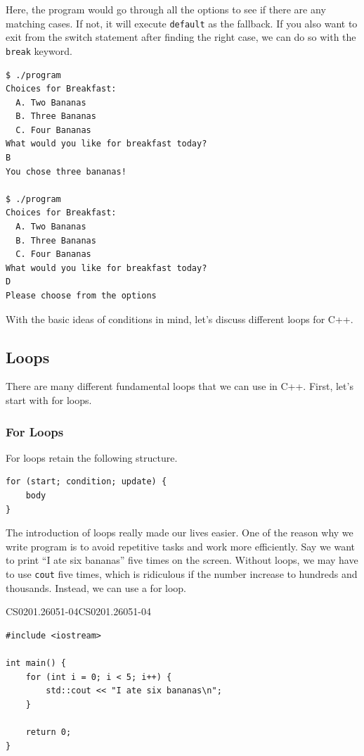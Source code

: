 \documentclass[../../main.tex]{subfiles}
\begin{document}
Here, the program would go through all the options to see
if there are any matching cases. If not, it will execute
\verb|default| as the fallback. If you also want to exit from the
switch statement after finding the right case, we can do so
with the \verb|break| keyword.

\begin{outputbox}
\begin{lstlisting}[style=basic]
$ ./program
Choices for Breakfast:
  A. Two Bananas
  B. Three Bananas
  C. Four Bananas
What would you like for breakfast today?
B
You chose three bananas!

$ ./program
Choices for Breakfast:
  A. Two Bananas
  B. Three Bananas
  C. Four Bananas
What would you like for breakfast today?
D
Please choose from the options
\end{lstlisting}
\end{outputbox}

With the basic ideas of conditions in mind, let's discuss different
loops for C++.

\subsection{Loops}

There are many different fundamental loops that we can use in C++.
First, let's start with for loops.

\subsubsection{For Loops}

For loops retain the following structure.

\begin{basicbox}
\begin{lstlisting}[style=basic]
for (start; condition; update) {
    body
}
\end{lstlisting}
\end{basicbox}

The introduction of loops really made our lives easier. One of the
reason why we write program is to avoid repetitive tasks and work
more efficiently. Say we want to print ``I ate six bananas'' five
times on the screen. Without loops, we may have to use \verb|cout|
five times, which is ridiculous if the number increase to hundreds
and thousands. Instead, we can use a for loop.

\begin{cppbox}{CS0201.26051-04}{CS0201.26051-04}
\begin{lstlisting}[style=cppstyle]
#include <iostream>

int main() {
    for (int i = 0; i < 5; i++) {
        std::cout << "I ate six bananas\n";
    }

    return 0;
}
\end{lstlisting}
\end{cppbox}
\end{document}
